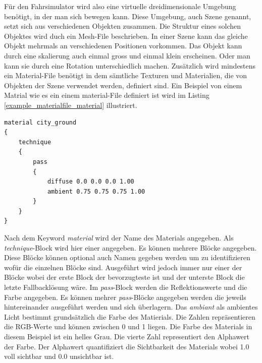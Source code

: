 Für den Fahrsimulator wird also eine virtuelle dreidimensionale Umgebung benötigt, in der man sich bewegen kann. Diese Umgebung, auch Szene genannt, setzt sich aus verschiedenen Objekten zusammen. Die Struktur eines solchen Objektes wird duch ein Mesh-File beschrieben. In einer Szene kann das gleiche Objekt mehrmals an verschiedenen Positionen vorkommen. Das Objekt kann durch eine skalierung auch einmal gross und einmal klein erscheinen. Oder man kann sie durch eine Rotation unterschiedlich machen. Zusätzlich wird mindestens ein Material-File benötigt in dem sämtliche Texturen und Materialien, die von Objekten der Szene verwendet werden, definiert sind.
Ein Beispiel von einem Matrial wie es ein einem material-File definiert ist wird im Listing \ref{example_materialfile_material} illustriert.
\begin{lstlisting}[caption={Beispiel aus dem material-File für ein Material},label={example_materialfile_material}]
material city_ground
{
	technique
	{
		pass
		{
			diffuse 0.0 0.0 0.0 1.00
			ambient 0.75 0.75 0.75 1.00	
		}
	}
}
\end{lstlisting}
Nach dem Keyword \textit{material} wird der Name des Materials angegeben. Als \textit{technique}-Block wird hier einer angegeben. Es können mehrere Blöcke angegeben. Diese Blöcke können optional auch Namen gegeben werden um zu identifizieren wofür die einzelnen Blöcke sind. Ausgeführt wird jedoch immer nur einer der Blöcke wobei der erste Block der bevorzugteste ist und der unterste Block die letzte Fallbacklösung wäre. Im \textit{pass}-Block werden die Reflektionswerte und die Farbe angegeben. Es können mehrer \textit{pass}-Blöcke angegeben werden die jeweils hintereinander ausgeführt werden und sich überlagern. Das \textit{ambiant} als ambientes Licht bestimmt grundsätzlich die Farbe des Matierials. Die Zahlen repräsentieren die RGB-Werte und können zwischen 0 und 1 liegen. Die Farbe des Materials in diesem Beispiel ist ein helles Grau. Die vierte Zahl representiert den Alphawert der Farbe. Der Alphawert quantifiziert die Sichtbarkeit des Materials wobei 1.0 voll sichtbar und 0.0 unsichtbar ist. \\

